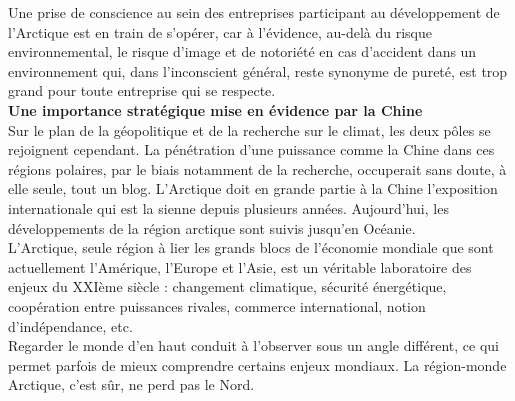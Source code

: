 \documentclass[8pt]{article}
\begin{document}
Une prise de conscience au sein des entreprises participant au développement de l’Arctique est en train de s’opérer, car à l’évidence, au-delà du risque environnemental, le risque d’image et de notoriété en cas d’accident dans un environnement qui, dans l’inconscient général, reste synonyme de pureté, est trop grand pour toute entreprise qui se respecte.\\

\textbf{Une importance stratégique mise en évidence par la Chine}\\

Sur le plan de la géopolitique et de la recherche sur le climat, les deux pôles se rejoignent cependant. La pénétration d’une puissance comme la Chine dans ces régions polaires, par le biais notamment de la recherche, occuperait sans doute, à elle seule, tout un blog. L’Arctique doit en grande partie à la Chine l’exposition internationale qui est la sienne depuis plusieurs années. Aujourd’hui, les développements de la région arctique sont suivis jusqu’en Océanie.\\

L’Arctique, seule région à lier les grands blocs de l’économie mondiale que sont actuellement l’Amérique, l’Europe et l’Asie, est un véritable laboratoire des enjeux du XXIème siècle : changement climatique, sécurité énergétique, coopération entre puissances rivales, commerce international, notion d’indépendance, etc.\\

Regarder le monde d’en haut conduit à l’observer sous un angle différent, ce qui permet parfois de mieux comprendre certains enjeux mondiaux. La région-monde Arctique, c’est sûr, ne perd pas le Nord.
\end{document}
